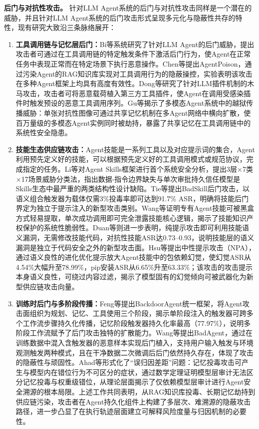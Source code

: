 \textbf{后门与对抗性攻击。}
针对LLM Agent系统的后门与对抗性攻击同样是一个潜在的威胁，并且针对LLM Agent系统的后门攻击形式呈现多元化与隐蔽性共存的特性，现有研究大致沿三条脉络展开：
\begin{enumerate}
  \item \textbf{工具调用链与记忆层后门：}Bi等\cite{bi2024backdoor}系统研究了针对LLM Agent的后门威胁，提出攻击者可通过在工具调用链的特定触发条件下激活后门行为，使Agent在正常任务中表现正常而在特定场景下执行恶意操作。Chen等\cite{chen2024agentpoison}提出AgentPoison，通过污染Agent的RAG知识库实现对工具调用行为的隐蔽操控，实验表明该攻击在多种Agent框架上均具有高度有效性。Dong等\cite{dong2025philosopher}研究了针对LLM插件机制的木马攻击，攻击者可将恶意载荷植入第三方工具插件，使Agent在调用受感染插件时触发预设的恶意工具调用序列。Gu等\cite{gu2024agent}揭示了多模态Agent系统中的越狱传播威胁：单张对抗性图像可通过共享记忆机制在多Agent网络中横向扩散，使百万量级的多模态Agent实例同时被劫持，暴露了共享记忆在工具调用链中的系统性安全隐患。
  \item \textbf{技能生态供应链攻击：}Agent技能是一系列工具以及对应提示词的集合，Agent利用预先定义好的技能，可以根据预先定义好的工具调用模式或规范协议，完成指定的任务。Li等\cite{li2026secure}对Agent Skills框架进行首个系统安全分析，提出3层×7类×17场景威胁分类法，指出数据-指令边界缺失与单次审批持久信任模型是Skills生态中最严重的两类结构性设计缺陷。Tie等\cite{tie2026badskill}提出BadSkill后门攻击，以语义组合触发器为载体仅需3\%投毒率即可达到91.7\% ASR，明确将技能后门界定为独立于提示注入的新型攻击类别。Wang等\cite{wang2026black}证明专有Agent技能可被黑盒方式轻易提取，单次成功调用即可完全泄露技能核心逻辑，揭示了技能知识产权保护的系统性脆弱性。Duan等\cite{duan2026skillattack}则进一步表明，纯提示攻击即可利用技能语义漏洞，无需修改技能代码，对抗性技能ASR达0.73--0.93，说明技能层的语义漏洞是独立于代码安全之外的新型攻击面。Hsu等\cite{hsu2026harmless}提出中性提示攻击（NPA），通过语义良性的进化优化提示放大Agent技能中的包依赖幻觉，使幻觉ASR从4.54\%大幅升至78.99\%，pip安装ASR从6.65\%升至63.33\%；该攻击的攻击提示本身语义良性，可绕过内容过滤，揭示了模型固有的幻觉倾向可被武器化为新型供应链攻击向量。
  \item \textbf{训练时后门与多阶段传播：}Feng等\cite{feng2026backdooragent}提出BackdoorAgent统一框架，将Agent攻击面组织为规划、记忆、工具使用三个阶段，揭示单阶段注入的触发器可跨多个工作流步骤持久化传播，记忆阶段触发器持久化率最高（77.97\%），说明多阶段工作流赋予了后门攻击独特的扩散能力。Wang等\cite{wang2024badagent}提出BadAgent，通过在训练数据中混入含触发器的恶意样本实现后门植入，支持用户输入触发与环境观测触发两种模式，且在干净数据二次微调后后门依然持久存在，体现了攻击的隐蔽性与顽固性。Ahad等\cite{ahad2026misattribution}形式化了“误归因差距”问题：记忆投毒攻击可产生与模型内在错位行为不可区分的症状，通过数学定理证明模型层审计无法区分记忆投毒与权重级错位，从理论层面揭示了仅依赖模型层审计进行Agent安全溯源的根本局限。上述工作共同表明，从RAG知识库投毒、长期记忆劫持到供应链污染，攻击者在Agent持久化组件上构建了多层次、难溯源的隐蔽攻击路径，进一步凸显了在执行轨迹层面建立可解释风险度量与归因机制的必要性。
\end{enumerate}

